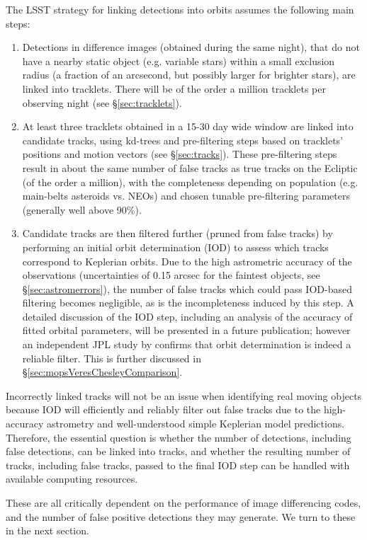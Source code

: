 The LSST strategy for linking detections into orbits assumes the following main steps:
\begin{enumerate}
\item Detections in difference images (obtained during the same night), that do not
         have a nearby static object (e.g. variable stars) within a small exclusion radius
         (a fraction of an arcsecond, but possibly larger for brighter stars), are linked into tracklets. There will be of the order
         a million tracklets per observing night (see \S\ref{sec:tracklets}).
\item At least three tracklets obtained in a 15-30 day wide window are linked into
         candidate tracks, using kd-trees and pre-filtering steps based on tracklets' positions
         and motion vectors (see \S\ref{sec:tracks}). These pre-filtering steps result in
         about the same number of false tracks as true tracks on the Ecliptic (of the order
         a million), with the completeness depending on population (e.g. main-belts
         asteroids vs. NEOs) and chosen tunable pre-filtering parameters (generally well above 90\%).
\item Candidate tracks are then filtered further (pruned from false tracks) by
        performing an initial orbit determination (IOD) to assess which tracks
        correspond to Keplerian orbits.
         Due to the high astrometric accuracy of the observations (uncertainties of 0.15 arcsec for the faintest objects,
         see \S\ref{sec:astromerrors}), the number of false tracks which 
         could pass IOD-based filtering becomes negligible, as is the incompleteness induced by this 
         step. A detailed discussion of the IOD step, 
         including an analysis of the accuracy of fitted orbital parameters,  will be presented in 
         a future publication; however an independent JPL study by \citet{VeresChesley2017mops} 
          confirms that orbit determination is indeed a reliable filter. This is further discussed in \S\ref{sec:mopsVeresChesleyComparison}.
\end{enumerate}

Incorrectly linked tracks will not be
an issue when identifying real moving objects because IOD will efficiently and reliably filter 
out false tracks due to the high-accuracy
astrometry and well-understood simple Keplerian model predictions. Therefore, the
essential question is whether the number of detections, including false detections, can be 
linked into tracks, and whether the resulting number of tracks, including false tracks, 
passed to the final IOD step can be handled with available computing resources.


These are all critically dependent on the performance of image differencing codes, and the number of false positive detections they may generate. We turn to these in the next section.
